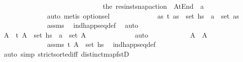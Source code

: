 \begin{isabellebody}
\ \ \ \ \ \ \ \ \ \ \ \ \ \ \ \ \ \ \ \ \ \ \ \ \ \ \ \ \ \ {\isachardoublequoteopen}the\ {\isacharparenleft}{\kern0pt}res{\isacharunderscore}{\kern0pt}inst{\isacharunderscore}{\kern0pt}snap{\isacharunderscore}{\kern0pt}action\ {\isasympi}\ At{\isacharunderscore}{\kern0pt}End{\isacharparenright}{\kern0pt}\ {\isacharequal}{\kern0pt}\ a{\isachardoublequoteclose}\isanewline
\ \ \ \ \ \ \ \ \ \ \ \ \isamarkupfalse%
\ auto\ {\isacharparenleft}{\kern0pt}metis\ option{\isachardot}{\kern0pt}sel{\isacharparenright}{\kern0pt}\isanewline
\ \ \ \ \ \ \ \ \ \ \isamarkupfalse%
\ \isamarkupfalse%
\ {\isachardoublequoteopen}{\isasymexists}as{\isachardot}{\kern0pt}\ {\isacharparenleft}{\kern0pt}t{\isacharcomma}{\kern0pt}\ as{\isacharparenright}{\kern0pt}\ {\isasymin}\ set\ hs\ {\isasymand}\ a\ {\isasymin}\ set\ as{\isachardoublequoteclose}\isanewline
\ \ \ \ \ \ \ \ \ \ \ \ \isamarkupfalse%
\ assms\ \isamarkupfalse%
\ ind{\isacharunderscore}{\kern0pt}happ{\isacharunderscore}{\kern0pt}seq{\isacharunderscore}{\kern0pt}def\ \isamarkupfalse%
\ auto\isanewline
\ \ \ \ \ \ \ \ \ \ \isamarkupfalse%
\ \isamarkupfalse%
\ A{\isacharprime}{\kern0pt}\ \ {\isachardoublequoteopen}{\isacharparenleft}{\kern0pt}t{\isacharcomma}{\kern0pt}\ A{\isacharprime}{\kern0pt}{\isacharparenright}{\kern0pt}\ {\isasymin}\ set\ hs{\isachardoublequoteclose}\ \ {\isachardoublequoteopen}a\ {\isasymin}\ set\ A{\isacharprime}{\kern0pt}{\isachardoublequoteclose}\isanewline
\ \ \ \ \ \ \ \ \ \ \ \ \isamarkupfalse%
\ auto\isanewline
\ \ \ \ \ \ \ \ \ \ \isamarkupfalse%
\ {\isachardoublequoteopen}A\ {\isacharequal}{\kern0pt}\ A{\isacharprime}{\kern0pt}{\isachardoublequoteclose}\isanewline
\ \ \ \ \ \ \ \ \ \ \ \ \isamarkupfalse%
\ assms\ {\isacartoucheopen}{\isacharparenleft}{\kern0pt}t{\isacharcomma}{\kern0pt}\ A{\isacharprime}{\kern0pt}{\isacharparenright}{\kern0pt}\ {\isasymin}\ set\ hs{\isacartoucheclose}\ \isamarkupfalse%
\ ind{\isacharunderscore}{\kern0pt}happ{\isacharunderscore}{\kern0pt}seq{\isacharunderscore}{\kern0pt}def\isanewline
\ \ \ \ \ \ \ \ \ \ \ \ \isamarkupfalse%
\ {\isacharparenleft}{\kern0pt}auto\ simp{\isacharcolon}{\kern0pt}\ strict{\isacharunderscore}{\kern0pt}sorted{\isacharunderscore}{\kern0pt}iff\ distinct{\isacharunderscore}{\kern0pt}map{\isacharunderscore}{\kern0pt}fstD{\isacharparenright}{\kern0pt}\isanewline

\end{isabellebody}
